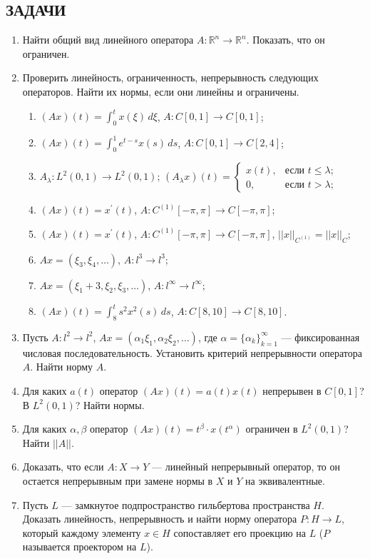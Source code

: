 \documentclass[12pt,a4paper]{article}
\begin{document}
\subsection*{ЗАДАЧИ}
\begin{enumerate}
\item Найти общий вид линейного оператора $A: \mathbb{R}^{n} \rightarrow \mathbb{R}^{n}$. Показать, что он ограничен.

\item Проверить линейность, ограниченность, непрерывность следующих операторов. Найти их нормы, если они линейны и ограничены.
\begin{enumerate}[label=\alph*)]
\item $(Ax)(t) = \int_{0}^{t} x(\xi) \, d\xi$, $A: C[0,1] \rightarrow C[0,1]$;
\item $(Ax)(t) = \int_{0}^{1} e^{t-s} x(s) \, ds$, $A: C[0,1] \rightarrow C[2,4]$;
\item $A_{\lambda}: L^{2}(0,1) \rightarrow L^{2}(0,1)$; $(A_{\lambda}x)(t) =
\begin{cases} x(t), & \text{если } t \le \lambda; \\ 0, & \text{если } t > \lambda;
\end{cases}$
\item $(Ax)(t) = x^{\prime}(t)$, $A: C^{(1)}[-\pi,\pi] \rightarrow C[-\pi,\pi]$;
\item $(Ax)(t) = x^{\prime}(t)$, $A: C^{(1)}[-\pi,\pi] \rightarrow C[-\pi,\pi]$, $||x||_{C^{(1)}} = ||x||_{C}$;
\item $Ax = (\xi_{3}, \xi_{4}, \dots)$, $A: l^{3} \rightarrow l^{3}$;
\item $Ax = (\xi_{1}+3, \xi_{2}, \xi_{3}, \dots)$, $A: l^{\infty} \rightarrow l^{\infty}$;
\item $(Ax)(t) = \int_{8}^{t} s^{2} x^{2}(s) \, ds$, $A: C[8,10] \rightarrow C[8,10]$.
\end{enumerate}

\item Пусть $A: l^{2} \rightarrow l^{2}$, $Ax = (\alpha_{1}\xi_{1}, \alpha_{2}\xi_{2}, \dots)$, где $\alpha = \{\alpha_{k}\}_{k=1}^{\infty}$ — фиксированная числовая последовательность. Установить критерий непрерывности оператора $A$. Найти норму $A$.

\item Для каких $a(t)$ оператор $(Ax)(t) = a(t)x(t)$ непрерывен в $C[0,1]$? В $L^{2}(0,1)$? Найти нормы.

\item Для каких $\alpha, \beta$ оператор $(Ax)(t) = t^{\beta} \cdot x(t^{\alpha})$ ограничен в $L^{2}(0,1)$? Найти $||A||$.

\item Доказать, что если $A: X \rightarrow Y$ — линейный непрерывный оператор, то он остается непрерывным при замене нормы в $X$ и $Y$ на эквивалентные.

\item Пусть $L$ — замкнутое подпространство гильбертова пространства $H$. Доказать линейность, непрерывность и найти норму оператора $P: H \rightarrow L$, который каждому элементу $x \in H$ сопоставляет его проекцию на $L$ ($P$ называется проектором на $L$).
\end{enumerate}
\end{document}
